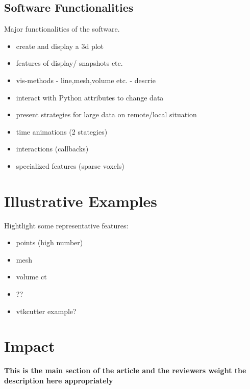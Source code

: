 \documentclass[preprint,12pt, a4paper]{elsarticle}
\begin{document}
\subsection{Software Functionalities}
\label{}

Major functionalities of the software.

\begin{itemize}
\item create and display a 3d plot
\item features of display/ snapshots etc.
\item vis-methods - line,mesh,volume etc. - descrie
\item interact with Python attributes to change data
\item present strategies for large data on remote/local situation
\item time animations (2 stategies)
\item interactions (callbacks)
\item specialized features (sparse voxels)

\end{itemize}

\section{Illustrative Examples}
\label{}

Hightlight some representative features:
\begin{itemize}
\item points (high number)
\item mesh 
\item  volume ct
\item  ?? 
\item vtkcutter example?
\end{itemize}


\section{Impact}
\label{}

\textbf{This is the main section of the article and the reviewers weight the description here appropriately}

\end{document}
